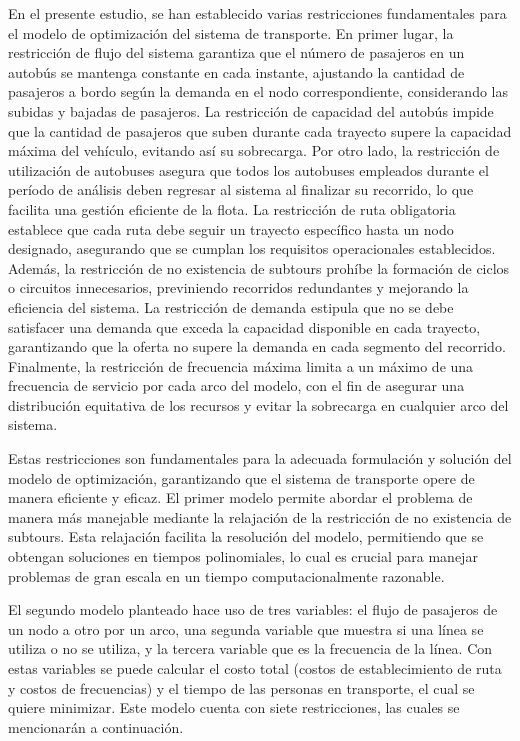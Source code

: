 \documentclass[preprint,11pt]{elsarticle}
\begin{document}
En el presente estudio, se han establecido varias restricciones fundamentales para el modelo de optimización del sistema de transporte. En primer lugar, la restricción de flujo del sistema garantiza que el número de pasajeros en un autobús se mantenga constante en cada instante, ajustando la cantidad de pasajeros a bordo según la demanda en el nodo correspondiente, considerando las subidas y bajadas de pasajeros. La restricción de capacidad del autobús impide que la cantidad de pasajeros que suben durante cada trayecto supere la capacidad máxima del vehículo, evitando así su sobrecarga. Por otro lado, la restricción de utilización de autobuses asegura que todos los autobuses empleados durante el período de análisis deben regresar al sistema al finalizar su recorrido, lo que facilita una gestión eficiente de la flota. La restricción de ruta obligatoria establece que cada ruta debe seguir un trayecto específico hasta un nodo designado, asegurando que se cumplan los requisitos operacionales establecidos. Además, la restricción de no existencia de subtours prohíbe la formación de ciclos o circuitos innecesarios, previniendo recorridos redundantes y mejorando la eficiencia del sistema. La restricción de demanda estipula que no se debe satisfacer una demanda que exceda la capacidad disponible en cada trayecto, garantizando que la oferta no supere la demanda en cada segmento del recorrido. Finalmente, la restricción de frecuencia máxima limita a un máximo de una frecuencia de servicio por cada arco del modelo, con el fin de asegurar una distribución equitativa de los recursos y evitar la sobrecarga en cualquier arco del sistema.

Estas restricciones son fundamentales para la adecuada formulación y solución del modelo de optimización, garantizando que el sistema de transporte opere de manera eficiente y eficaz. El primer modelo permite abordar el problema de manera más manejable mediante la relajación de la restricción de no existencia de subtours. Esta relajación facilita la resolución del modelo, permitiendo que se obtengan soluciones en tiempos polinomiales, lo cual es crucial para manejar problemas de gran escala en un tiempo computacionalmente razonable.

El segundo modelo planteado hace uso de tres variables: el flujo de pasajeros de un nodo a otro por un arco, una segunda variable que muestra si una línea se utiliza o no se utiliza, y la tercera variable que es la frecuencia de la línea. Con estas variables se puede calcular el costo total (costos de establecimiento de ruta y costos de frecuencias) y el tiempo de las personas en transporte, el cual se quiere minimizar. Este modelo cuenta con siete restricciones, las cuales se mencionarán a continuación.
\end{document}
